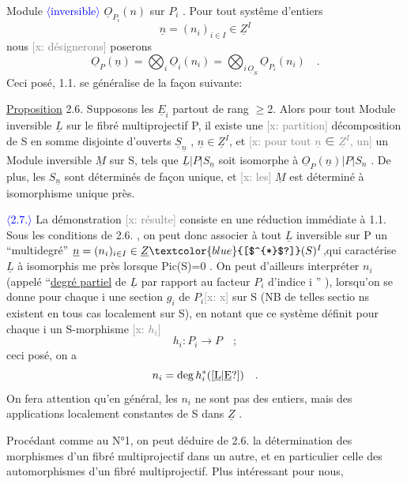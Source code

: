 \documentclass[11pt]{article}
\newcommand{\scanpage}[1]{\par\bigskip\noindent{\small\sffamily[scan #1]}\par}
\newcommand{\mspage}[1]{{\small\sffamily[p.\,#1]}}
\newcommand{\hand}[1]{\textcolor{blue}{#1}}
\newcommand{\inserted}[2][]{\textcolor{blue}{$\langle$#2$\rangle$}}
\newcommand{\xout}[1]{\textcolor{gray}{[\textsf{x:} #1]}}
\newcommand{\uline}[1]{\underline{#1}}
\newcommand{\unsure}[1]{[#1?]}
\begin{document}
\mspage{107}

\clearpage
\scanpage{25/108}
\mspage{11}

Module \inserted{inversible} $\underline{O}_{P_i}(n)$ sur $P_i$ . Pour tout systême d'entiers
\[ \underline{n} = (n_i)_{i \in I} \in \underline{Z}^I \]
nous \xout{désignerons} poserons
\[ \underline{O}_P(\underline{n}) = \bigotimes_i \underline{O}_i(n_i) = \bigotimes_{i\,\underline{O}_S} \underline{O}_{P_i}(n_i) \quad . \]
Ceci posé, 1.1. se généralise de la façon suivante:

\uline{Proposition} 2.6. Supposons les $\underline{E}_i$ partout de rang $\geq$2. Alors pour tout
Module inversible $\underline{L}$ sur le fibré multiprojectif P, il existe une
\xout{partition} décomposition de S en somme disjointe d'ouverts $\underline{S}_{\underline{n}}$ , $\underline{n} \in \underline{Z}^I$,
et \xout{pour tout $\underline{n}$ ∈ $\underline{Z}^I$, un} un Module inversible $\underline{M}$ sur S, tels que $\underline{L}|P|S_{\underline{n}}$
soit isomorphe à $\underline{O}_P(\underline{n})|P|S_n$ . De plus, les $S_{\underline{n}}$ sont déterminés de façon
unique, et \xout{les} $\underline{M}$ est déterminé à isomorphisme unique près.

\inserted{2.7.} La démonstration \xout{résulte} consiste en une réduction immédiate à 1.1.
Sous les conditions de 2.6. , on peut donc associer à tout $\underline{L}$ inversible
sur P un ``multidegré'' $\underline{n} = (n_i)_{i \in I} \in \underline{Z}\hand{\unsure{$^{*}$}}(S)^I$,qui caractérise $\underline{L}$ à isomorphis
me près lorsque Pic(S)=0 . On peut d'ailleurs interpréter $n_i$ (appelé
``\uline{degré partiel} de $\underline{L}$ par rapport au facteur $P_i$ d'indice i '' ), lorsqu'on
se donne pour chaque i une section $g_i$ de $P_i$\xout{x} sur S (NB de telles sectio
ns existent en tous cas localement sur S), en notant que ce système définit
pour chaque i un S-morphisme \xout{$h_i$}
\[ h_i : P_i \longrightarrow P \quad ; \]
ceci posé, on a
\[ n_i = \deg h_i^{*}(\unsure{$\underline{L}$|$\underline{E}$}) \quad . \]
On fera attention qu'en général, les $n_i$ ne sont pas des entiers, mais des
applications localement constantes de S dans $\underline{Z}$ .

Procédant comme au N°1, on peut déduire de 2.6. la détermination des
morphismes d'un fibré multiprojectif dans un autre, et en particulier celle
des automorphismes d'un fibré multiprojectif. Plus intéressant pour nous,
\end{document}

